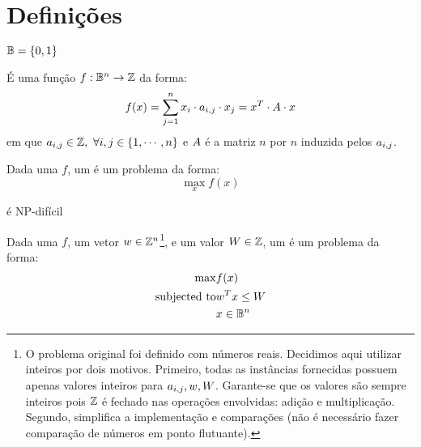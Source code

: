 \section{Definições}

\begin{defn}
    $\mathbb{B} = \left\{0, 1\right\}$
\end{defn}

\begin{defn}
    É uma função $f: \mathbb{B}^n \rightarrow \mathbb{Z}$ da forma:
    \begin{equation}
        \label{eq:qbf}
        f(x)
        = \displaystyle\sum\limits_{j = 1}^{n} x_i \cdot a_{i,j} \cdot x_j
        = x^{T} \cdot A \cdot x
    \end{equation}
    em que $a_{i,j} \in \mathbb{Z}, \ \forall i,j \in \left\{1, \cdots, n\right\}$ e $A$ é a matriz $n$ por $n$ induzida pelos $a_{i,j}$.
\end{defn}

\begin{defn}
Dada uma \qbf $f$, um \maxqbf é um problema da forma:
\begin{equation}
    \label{eq:max-qbf}
    \max\limits_{x} f(x)
\end{equation}
\end{defn}

\begin{fact}
\maxqbf é NP-difícil \cite{bib:qbf}
\end{fact}

\begin{defn}
Dada uma \qbf $f$, um vetor $w \in \mathbb{Z}^n$\footnote{O problema original foi definido com números reais. Decidimos aqui utilizar inteiros por dois motivos. Primeiro, todas as instâncias fornecidas possuem apenas valores inteiros para $a_{i,j}, w, W$. Garante-se que os valores são sempre inteiros pois $\mathbb{Z}$ é fechado nas operações envolvidas: adição e multiplicação. Segundo, simplifica a implementação e comparações (não é necessário fazer comparação de números em ponto flutuante).}, e um valor $W \in \mathbb{Z}$, um \maxkqbf é um problema da forma:
\begin{eqnarray*}
    \label{eq:max-kqbf}
    \max & f(x) \\
    \mbox{subjected to} & w^{T} x \leq W \\
    & x \in \mathbb{B}^n
\end{eqnarray*}
\end{defn}
